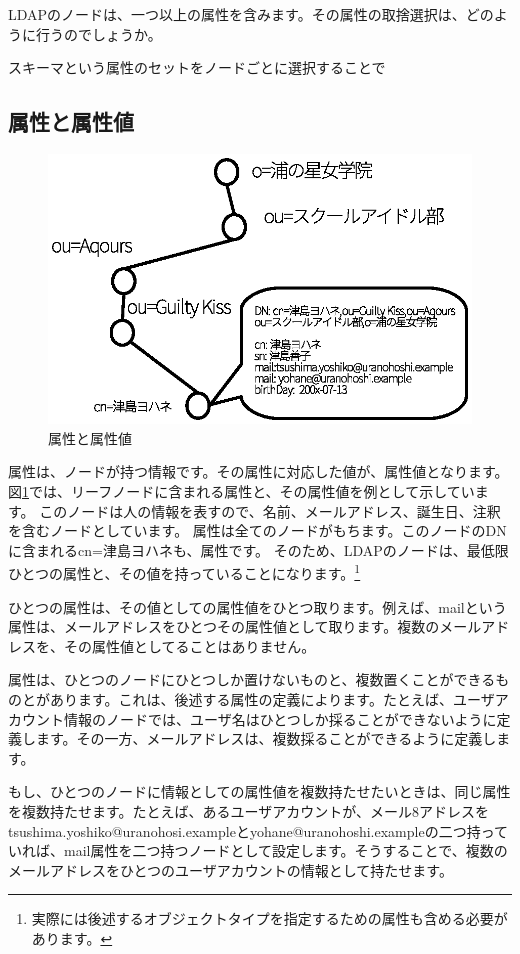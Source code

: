 LDAPのノードは、一つ以上の属性を含みます。その属性の取捨選択は、どのように行うのでしょうか。

スキーマという属性のセットをノードごとに選択することで

\subsection{属性と属性値}

\begin{figure}[htbp]
	\includegraphics[width=12cm,clip]{draw/attribute.eps}
	\caption{属性と属性値}
	\label{fig:attribute}
\end{figure}

属性は、ノードが持つ情報です。その属性に対応した値が、属性値となります。
図\ref{fig:attribute}では、リーフノードに含まれる属性と、その属性値を例として示しています。
このノードは人の情報を表すので、名前、メールアドレス、誕生日、注釈を含むノードとしています。
属性は全てのノードがもちます。このノードのDNに含まれるcn=津島ヨハネも、属性です。
そのため、LDAPのノードは、最低限ひとつの属性と、その値を持っていることになります。\footnote{実際には後述するオブジェクトタイプを指定するための属性も含める必要があります。}

ひとつの属性は、その値としての属性値をひとつ取ります。例えば、mailという属性は、メールアドレスをひとつその属性値として取ります。複数のメールアドレスを、その属性値としてることはありません。

属性は、ひとつのノードにひとつしか置けないものと、複数置くことができるものとがあります。これは、後述する属性の定義によります。たとえば、ユーザアカウント情報のノードでは、ユーザ名はひとつしか採ることができないように定義します。その一方、メールアドレスは、複数採ることができるように定義します。

もし、ひとつのノードに情報としての属性値を複数持たせたいときは、同じ属性を複数持たせます。たとえば、あるユーザアカウントが、メール8アドレスをtsushima.yoshiko@uranohosi.exampleとyohane@uranohoshi.exampleの二つ持っていれば、mail属性を二つ持つノードとして設定します。そうすることで、複数のメールアドレスをひとつのユーザアカウントの情報として持たせます。

